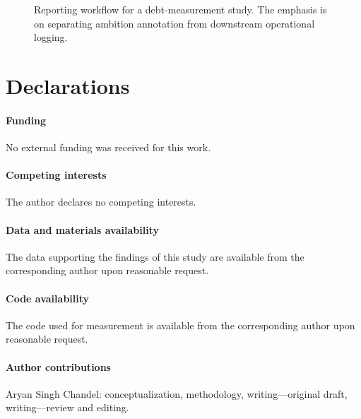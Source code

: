 \documentclass{svjour3}
\begin{document}
\begin{figure}[t]
\centering
{}
\caption{Reporting workflow for a debt-measurement study. The emphasis is on separating ambition annotation from downstream operational logging.}
\label{fig:alluka-workflow}
\end{figure}


\section*{Declarations}
\paragraph{Funding} No external funding was received for this work.
\paragraph{Competing interests} The author declares no competing interests.
\paragraph{Data and materials availability} The data supporting the findings of this study are available from the corresponding author upon reasonable request.
\paragraph{Code availability} The code used for measurement is available from the corresponding author upon reasonable request.
\paragraph{Author contributions} Aryan Singh Chandel: conceptualization, methodology, writing---original draft, writing---review and editing.



\end{document}
